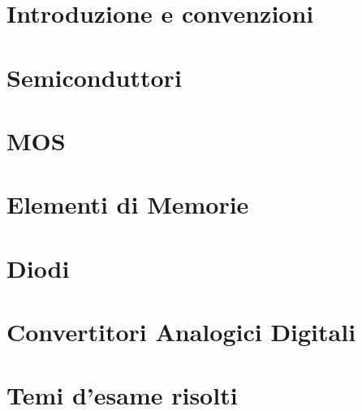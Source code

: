\providecommand{\main}{.}






{\hypersetup{hidelinks}
  \tableofcontents  %
}

\clearpage
\chapter{Introduzione e convenzioni}
\clearpage

\clearpage
\chapter{Semiconduttori}
\clearpage

\clearpage
\chapter{MOS}
\clearpage

\clearpage
\chapter{Elementi di Memorie}
\clearpage

\clearpage
\chapter{Diodi}
\clearpage

\clearpage
\chapter{Convertitori Analogici Digitali}
\clearpage

\clearpage
\chapter{Temi d'esame risolti}
\clearpage

\clearpage


\appendix
%




